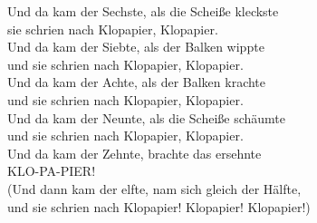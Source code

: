 Und da kam der Sechste, als die Scheiße kleckste\\ 
sie schrien nach Klopapier, Klopapier.\\

Und da kam der Siebte, als der Balken wippte\\
und sie schrien nach Klopapier, Klopapier.\\

Und da kam der Achte, als der Balken krachte\\
und sie schrien nach Klopapier, Klopapier.\\

Und da kam der Neunte, als die Scheiße schäumte\\
und sie schrien nach Klopapier, Klopapier.\\

Und da kam der Zehnte, brachte das ersehnte\\
KLO-PA-PIER!\\

(Und dann kam der elfte, nam sich gleich der Hälfte,\\
und sie schrien nach Klopapier! Klopapier! Klopapier!)


